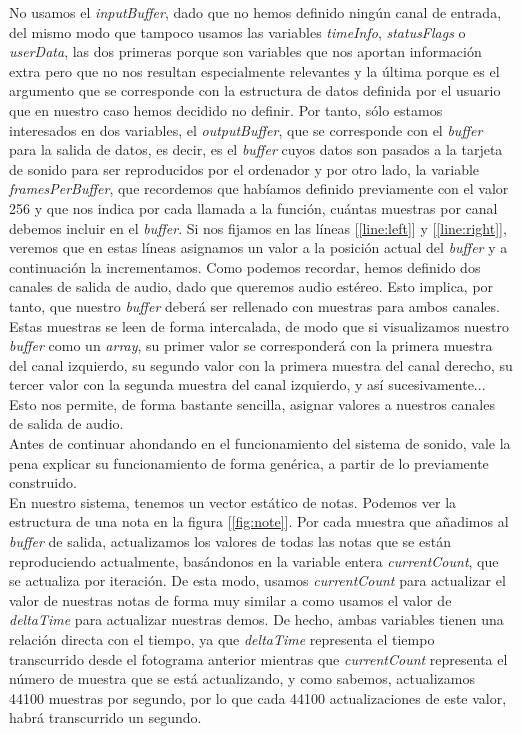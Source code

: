 No usamos el \emph{inputBuffer}, dado que no hemos definido ningún canal de entrada, del mismo modo que tampoco usamos las variables \emph{timeInfo}, \emph{statusFlags} o \emph{userData}, las dos primeras porque son variables que nos aportan información extra pero que no nos resultan especialmente relevantes y la última porque es el argumento que se corresponde con la estructura de datos definida por el usuario que en nuestro caso hemos decidido no definir. Por tanto, sólo estamos interesados en dos variables, el \emph{outputBuffer}, que se corresponde con el \emph{buffer} para la salida de datos, es decir, es el \emph{buffer} cuyos datos son pasados a la tarjeta de sonido para ser reproducidos por el ordenador y por otro lado, la variable \emph{framesPerBuffer}, que recordemos que habíamos definido previamente con el valor 256 y que nos indica por cada llamada a la función, cuántas muestras por canal debemos incluir en el \emph{buffer}. Si nos fijamos en las líneas [\ref{line:left}] y [\ref{line:right}], veremos que en estas líneas asignamos un valor a la posición actual del \emph{buffer} y a continuación la incrementamos. Como podemos recordar, hemos definido dos canales de salida de audio, dado que queremos audio estéreo. Esto implica, por tanto, que nuestro \emph{buffer} deberá ser rellenado con muestras para ambos canales. Estas muestras se leen de forma intercalada, de modo que si visualizamos nuestro \emph{buffer} como un \emph{array}, su primer valor se corresponderá con la primera muestra del canal izquierdo, su segundo valor con la primera muestra del canal derecho, su tercer valor con la segunda muestra del canal izquierdo, y así sucesivamente... Esto nos permite, de forma bastante sencilla, asignar valores a nuestros canales de salida de audio.\\

Antes de continuar ahondando en el funcionamiento del sistema de sonido, vale la pena explicar su funcionamiento de forma genérica, a partir de lo previamente construido.\\

En nuestro sistema, tenemos un vector estático de notas. Podemos ver la estructura de una nota en la figura [\ref{fig:note}]. Por cada muestra que añadimos al \emph{buffer} de salida, actualizamos los valores de todas las notas que se están reproduciendo actualmente, basándonos en la variable entera \emph{currentCount}, que se actualiza por iteración. De esta modo, usamos \emph{currentCount} para actualizar el valor de nuestras notas de forma muy similar a como usamos el valor de \emph{deltaTime} para actualizar nuestras demos. De hecho, ambas variables tienen una relación directa con el tiempo, ya que \emph{deltaTime} representa el tiempo transcurrido desde el fotograma anterior mientras que \emph{currentCount} representa el número de muestra que se está actualizando, y como sabemos, actualizamos 44100 muestras por segundo, por lo que cada 44100 actualizaciones de este valor, habrá transcurrido un segundo.\\

